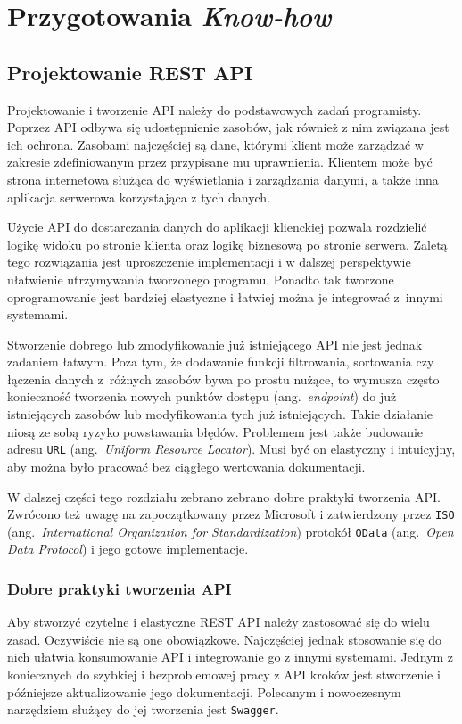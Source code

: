 \chapter{Przygotowania \emph{Know-how}}
\label{chap:know-how}
\section{Projektowanie REST API}
\label{sec:projektowanie-api}
Projektowanie i tworzenie API należy do podstawowych zadań programisty. Poprzez API odbywa się udostępnienie zasobów, jak również z nim związana jest ich ochrona. Zasobami najczęściej są dane, którymi klient może zarządzać w zakresie zdefiniowanym przez przypisane mu uprawnienia. Klientem może być strona internetowa służąca do wyświetlania i zarządzania danymi, a także inna aplikacja serwerowa korzystająca z tych danych.

Użycie API do dostarczania danych do aplikacji klienckiej pozwala rozdzielić logikę widoku po stronie klienta oraz logikę biznesową po stronie serwera. Zaletą tego rozwiązania jest uproszczenie implementacji i w dalszej perspektywie ułatwienie utrzymywania tworzonego programu. Ponadto tak tworzone oprogramowanie jest bardziej elastyczne i łatwiej można je integrować z~innymi systemami. 

Stworzenie dobrego lub zmodyfikowanie już istniejącego API nie jest jednak zadaniem łatwym. Poza tym, że dodawanie funkcji filtrowania, sortowania czy łączenia danych z~różnych zasobów bywa po prostu nużące, to wymusza często konieczność tworzenia nowych punktów dostępu (ang.~\emph{endpoint}) do już istniejących zasobów lub modyfikowania tych już istniejących. Takie działanie niosą ze sobą ryzyko powstawania błędów. Problemem jest także budowanie adresu \texttt{URL} (ang.~\emph{Uniform Resource Locator}). Musi być on elastyczny i intuicyjny, aby można było pracować bez ciągłego wertowania dokumentacji. 

W dalszej części tego rozdziału zebrano zebrano dobre praktyki tworzenia API. Zwrócono też uwagę na zapoczątkowany przez Microsoft i zatwierdzony przez \texttt{ISO} (ang.~\emph{International Organization for Standardization}) protokół \texttt{OData} (ang.~\emph{Open Data Protocol}) i jego gotowe implementacje.

\subsection{Dobre praktyki tworzenia API} 
\label{subsec:api-dobre-praktyki}
Aby stworzyć czytelne i elastyczne REST API należy zastosować się do wielu zasad. Oczywiście nie są one obowiązkowe. Najczęściej jednak stosowanie się do nich ułatwia konsumowanie API i integrowanie go z innymi systemami. Jednym z koniecznych do szybkiej i bezproblemowej pracy z API kroków jest stworzenie i późniejsze aktualizowanie jego dokumentacji. Polecanym i nowoczesnym narzędziem służący do jej tworzenia jest \texttt{Swagger}. 


